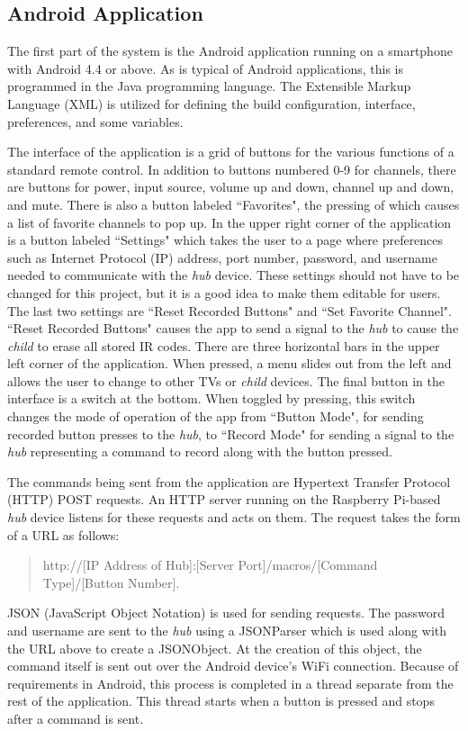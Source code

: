 \documentclass[12pt]{article}
\begin{document}
\subsection*{Android Application}
The first part of the system is the Android application running on a smartphone with Android 4.4 or above. As is typical of Android applications, this is programmed in the Java programming language. The Extensible Markup Language (XML) is utilized for defining the build configuration, interface, preferences, and some variables. 

The interface of the application is a grid of buttons for the various functions of a standard remote control. In addition to buttons numbered 0-9 for channels, there are buttons for power, input source, volume up and down, channel up and down, and mute. There is also a button labeled ``Favorites", the pressing of which causes a list of favorite channels to pop up. In the upper right corner of the application is a button labeled ``Settings" which takes the user to a page where preferences such as Internet Protocol (IP) address, port number, password, and username needed to communicate with the \emph{hub} device. These settings should not have to be changed for this project, but it is a good idea to make them editable for users. The last two settings are ``Reset Recorded Buttons" and ``Set Favorite Channel". ``Reset Recorded Buttons" causes the app to send a signal to the \emph{hub} to cause the \emph{child} to erase all stored IR codes. There are three horizontal bars in the upper left corner of the application. When pressed, a menu slides out from the left and allows the user to change to other TVs or \emph{child} devices. The final button in the interface is a switch at the bottom. When toggled by pressing, this switch changes the mode of operation of the app from ``Button Mode", for sending recorded button presses to the \emph{hub}, to ``Record Mode" for sending a signal to the \emph{hub} representing a command to record along with the button pressed.

The commands being sent from the application are Hypertext Transfer Protocol (HTTP) POST requests. An HTTP server running on the Raspberry Pi-based \emph{hub} device listens for these requests and acts on them. The request takes the form of a URL as follows:
\begin{quote}
http://[IP Address of Hub]:[Server Port]/macros/[Command Type]/[Button Number]. 
\end{quote}
JSON (JavaScript Object Notation) is used for sending requests. The password and username are sent to the \emph{hub} using a JSONParser which is used along with the URL above to create a JSONObject. At the creation of this object, the command itself is sent out over the Android device's WiFi connection. Because of requirements in Android, this process is completed in a thread separate from the rest of the application. This thread starts when a button is pressed and stops after a command is sent.       
 
\end{document}
